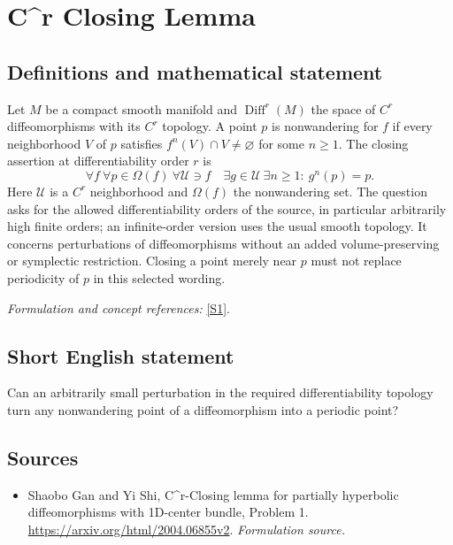 \documentclass[11pt]{article}
\begin{document}
\section*{\texorpdfstring{C\textasciicircum{}r Closing Lemma}{C\textasciicircum{}r Closing Lemma}}\label{318}
\subsection{Definitions and mathematical statement}
Let $M$ be a compact smooth manifold and $\operatorname{Diff}^r(M)$ the space of $C^r$ diffeomorphisms with its $C^r$ topology. A point $p$ is nonwandering for $f$ if every neighborhood $V$ of $p$ satisfies $f^n(V)\cap V\ne\varnothing$ for some $n\ge1$. The closing assertion at differentiability order $r$ is
\[
 \forall f\ \forall p\in\Omega(f)\ \forall\mathcal U\ni f
 \quad\exists g\in\mathcal U\ \exists n\ge1:\ g^n(p)=p.
\]
Here $\mathcal U$ is a $C^r$ neighborhood and $\Omega(f)$ the nonwandering set. The question asks for the allowed differentiability orders of the source, in particular arbitrarily high finite orders; an infinite-order version uses the usual smooth topology. It concerns perturbations of diffeomorphisms without an added volume-preserving or symplectic restriction. Closing a point merely near $p$ must not replace periodicity of $p$ in this selected wording.
\par\smallskip\textit{Formulation and concept references:} \href{https://arxiv.org/html/2004.06855v2}{[S1]}.

\subsection{Short English statement}
Can an arbitrarily small perturbation in the required differentiability topology turn any nonwandering point of a diffeomorphism into a periodic point?
\subsection{Sources}
\begin{itemize}
\item[S1]Shaobo Gan and Yi Shi, C\textasciicircum{}r-Closing lemma for partially hyperbolic diffeomorphisms with 1D-center bundle, Problem 1.
\url{https://arxiv.org/html/2004.06855v2}.
\textit{Formulation source.}
\end{itemize}
\end{document}
